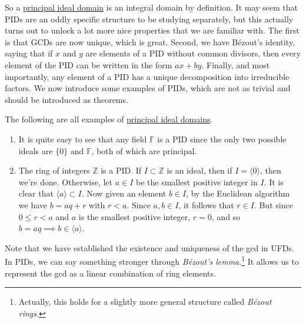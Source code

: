   So a \hyperref[def:principal-ideal-domain]{principal ideal domain} is an integral domain by definition. It may seem that PIDs are an oddly specific structure to be studying separately, but this actually turns out to unlock a lot more nice properties that we are familiar with. The first is that GCDs are now unique, which is great. Second, we have Bézout's identity, saying that if $x$ and $y$ are elements of a PID without common divisors, then every element of the PID can be written in the form $a x + b y$. Finally, and most importantly, any element of a PID has a unique decomposition into irreducible factors. We now introduce some examples of PIDs, which are not as trivial and should be introduced as theorems. 

  \begin{example}
    \label{ex:integers-and-polynomials-over-fields-are-pids}
    The following are all examples of \hyperref[def:principal-ideal-domain]{principal ideal domains}. 
    \begin{enumerate}
      \item It is quite easy to see that any field $\mathbb{F}$ is a PID since the only two possible ideals are $\{0\}$ and $\mathbb{F}$, both of which are principal. 

      \item The ring of integers $\mathbb{Z}$ is a PID. If $I \subset \mathbb{Z}$ is an ideal, then if $I = \langle 0 \rangle$, then we're done. Otherwise, let $a \in I$ be the smallest positive integer in $I$. It is clear that $\langle a \rangle \subset I$. Now given an element $b \in I$, by the Euclidean algorithm we have $b = aq + r$ with $r < a$. Since $a, b \in I$, it follows that $r \in I$. But since $0 \leq r < a$ and $a$ is the smallest positive integer, $r = 0$, and so $b = aq \implies b \in \langle a \rangle$. 
    \end{enumerate}
  \end{example}

  Note that we have established the existence and uniqueness of the gcd in UFDs. In PIDs, we can say something stronger through \textit{Bézout's lemma}.\footnote{Actually, this holds for a slightly more general structure called \textit{Bézout rings}. } It allows us to represent the gcd as a linear combination of ring elements. 

